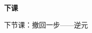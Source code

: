 \documentclass[10pt]{beamer}
\begin{document}
\begin{frame}
  \begin{center}
    \vspace{1.6cm}
    {\Large\textcolor{textgreen}{\bfseries 下课}}

    \vspace{1.0cm}
    {\large\textcolor{accentgreen}{下节课：撤回一步——逆元}}
  \end{center}
\end{frame}
\end{document}
